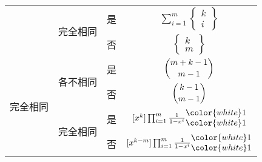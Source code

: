 \begin{itemize}
\begin{center}
\begin{tabular}{|c|c|c|c|}
                      & \multirow{2}{*}{完全相同} & 是    & $\sum_{i=1}^{m} {\begin{Bmatrix} k \\ i \end{Bmatrix}}$ \\ \cline{3-4}
                      &                       & 否    & $\begin{Bmatrix} k \\ m \end{Bmatrix}$                  \\ \hline
\multirow{4}{*}{完全相同} & \multirow{2}{*}{各不相同} & 是    & $\dbinom{m + k - 1}{m-1}$                               \\ \cline{3-4}
                      &                       & 否    & $\dbinom{k-1}{m-1}$                                     \\ \cline{2-4}
                      & \multirow{2}{*}{完全相同} & 是    & $[x^k] \prod_{i=1}^{m} \frac{1}{1 - x ^ i} \begin{matrix} {\color{white}1} \\ {\color{white}1} \end{matrix}$             \\ \cline{3-4}
                      &                       & 否    & $ [x^{k-m}] \prod_{i=1}^{m} \frac{1}{1 - x ^ i} \begin{matrix} {\color{white}1} \\ {\color{white}1} \end{matrix}$       \\ \hline
\end{tabular}
\end{center}
\end{itemize}
